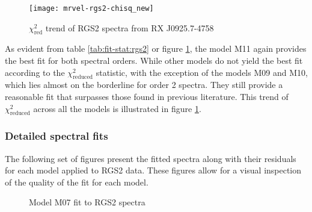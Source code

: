 			\begin{figure}[h!]
				\centering
				\texttt{[image: mrvel-rgs2-chisq\_new]}
				\caption{$\chi^2_\text{red}$ trend of RGS2 spectra from RX J0925.7-4758}
				\label{fig:mrvel-rgs2-chisq}
			\end{figure}
			
			As evident from table \ref{tab:fit-stat:rgs2} or figure \ref{fig:mrvel-rgs2-chisq}, the model M11 again provides the best fit for both spectral orders. While other models do not yield the best fit according to the $\chi^2_\text{reduced}$ statistic, with the exception of the models M09 and M10, which lies almost on the borderline for order 2 spectra. They still provide a reasonable fit that surpasses those found in previous literature. This trend of $\chi^2_\text{reduced}$ across all the models is illustrated in figure \ref{fig:mrvel-rgs2-chisq}.
			
			\subsubsection*{Detailed spectral fits}		
				The following set of figures present the fitted spectra along with their residuals for each model applied to RGS2 data. These figures allow for a visual inspection of the quality of the fit for each model.
			\begin{figure}[h!]
				\centering
				 \hfill
				\caption{Model M07 fit to RGS2 spectra}
				\label{xmm:rgs2-m07}
			\end{figure}
			
